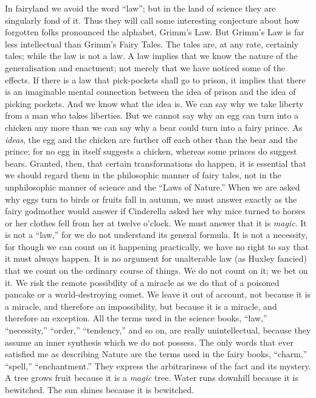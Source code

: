 \documentclass{book}
\begin{document}
In fairyland we avoid the word “law”; but in the land of science they are singularly fond of it. Thus they will call some interesting conjecture about how forgotten folks pronounced the alphabet, Grimm’s Law. But Grimm’s Law is far less intellectual than Grimm’s Fairy Tales. The tales are, at any rate, certainly tales; while the law is not a law. A law implies that we know the nature of the generalisation and enactment; not merely that we have noticed some of the effects. If there is a law that pick-pockets shall go to prison, it implies that there is an imaginable mental connection between the idea of prison and the idea of picking pockets. And we know what the idea is. We can say why we take liberty from a man who takes liberties. But we cannot say why an egg can turn into a chicken any more than we can say why a bear could turn into a fairy prince. As \emph{ideas}, the egg and the chicken are further off each other than the bear and the prince; for no egg in itself suggests a chicken, whereas some princes do suggest bears. Granted, then, that certain transformations do happen, it is essential that we should regard them in the philosophic manner of fairy tales, not in the unphilosophic manner of science and the “Laws of Nature.” When we are asked why eggs turn to birds or fruits fall in autumn, we must answer exactly as the fairy godmother would answer if Cinderella asked her why mice turned to horses or her clothes fell from her at twelve o’clock. We must answer that it is \emph{magic}. It is not a “law,” for we do not understand its general formula. It is not a necessity, for though we can count on it happening practically, we have no right to say that it must always happen. It is no argument for unalterable law (as Huxley fancied) that we count on the ordinary course of things. We do not count on it; we bet on it. We risk the remote possibility of a miracle as we do that of a poisoned pancake or a world-destroying comet. We leave it out of account, not because it is a miracle, and therefore an impossibility, but because it is a miracle, and therefore an exception. All the terms used in the science books, “law,” “necessity,” “order,” “tendency,” and so on, are really unintellectual, because they assume an inner synthesis which we do not possess. The only words that ever satisfied me as describing Nature are the terms used in the fairy books, “charm,” “spell,” “enchantment.” They express the arbitrariness of the fact and its mystery. A tree grows fruit because it is a \emph{magic} tree. Water runs downhill because it is bewitched. The sun shines because it is bewitched.
\end{document}
